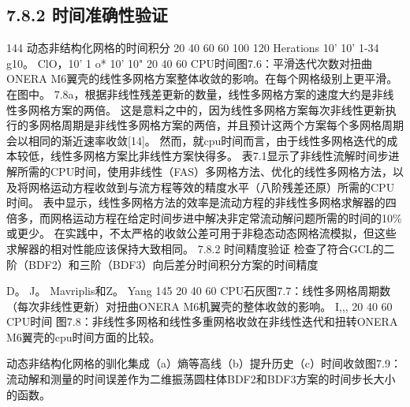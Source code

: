 \documentclass[UTF8,11pt,a4paper,openany,fontset=fandol]{ctexbook}
\begin{document}
\subsection{7.8.2 时间准确性验证}
144 动态非结构化网格的时间积分 20 40 60 60 100 120 Herations 10' 10' 1-34 g10。 ClO，10' 1 o* 10' 10" 20 40 60 CPU时间图7.6：平滑迭代次数对扭曲ONERA M6翼壳的线性多网格方案整体收敛的影响。在每个网格级别上更平滑。 在图中。 7.8a，根据非线性残差更新的数量，线性多网格方案的速度大约是非线性多网格方案的两倍。 这是意料之中的，因为线性多网格方案每次非线性更新执行的多网格周期是非线性多网格方案的两倍，并且预计这两个方案每个多网格周期会以相同的渐近速率收敛[14]。 然而，就cpu时间而言，由于线性多网格迭代的成本较低，线性多网格方案比非线性方案快得多。 表7.1显示了非线性流解时间步进解所需的CPU时间，使用非线性（FAS）多网格方法、优化的线性多网格方法，以及将网格运动方程收敛到与流方程等效的精度水平（八阶残差还原）所需的CPU时间。 表中显示，线性多网格方法的效率是流动方程的非线性多网格求解器的四倍多，而网格运动方程在给定时间步进中解决非定常流动解问题所需的时间的10\%或更少。 在实践中，不太严格的收敛公差可用于非稳态动态网格流模拟，但这些求解器的相对性能应该保持大致相同。 7.8.2 时间精度验证 检查了符合GCL的二阶（BDF2）和三阶（BDF3）向后差分时间积分方案的时间精度

D。 J。 Mavriplis和Z。 Yang 145 20 40 60 CPU石灰图7.7：线性多网格周期数（每次非线性更新）对扭曲ONERA M6机翼壳的整体收敛的影响。 I,,, 20 40 60 CPU时间 图7.8：非线性多网格和线性多重网格收敛在非线性迭代和扭转ONERA M6翼壳的cpu时间方面的比较。

动态非结构化网格的驯化集成（a）熵等高线（b）提升历史（c）时间收敛图7.9：流动解和测量的时间误差作为二维振荡圆柱体BDF2和BDF3方案的时间步长大小的函数。
\end{document}

